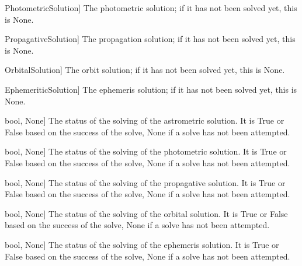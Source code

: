 \documentclass[letterpaper,11pt,english]{sphinxmanual}
\begin{document}
\begin{savenotes}
\begin{fulllineitems}
\begin{description}
\sphinxlineitem{photometrics}{[}PhotometricSolution{]}
\sphinxAtStartPar
The photometric solution; if it has not been solved yet, this is None.

\sphinxlineitem{propagatives}{[}PropagativeSolution{]}
\sphinxAtStartPar
The propagation solution; if it has not been solved yet, this is None.

\sphinxlineitem{orbitals}{[}OrbitalSolution{]}
\sphinxAtStartPar
The orbit solution; if it has not been solved yet, this is None.

\sphinxlineitem{ephemeritics}{[}EphemeriticSolution{]}
\sphinxAtStartPar
The ephemeris solution; if it has not been solved yet, this is None.

\sphinxlineitem{astrometrics\_status}{[}bool, None{]}
\sphinxAtStartPar
The status of the solving of the astrometric solution. It is True or
False based on the success of the solve, None if a solve has not
been attempted.

\sphinxlineitem{photometrics\_status}{[}bool, None{]}
\sphinxAtStartPar
The status of the solving of the photometric solution. It is True or
False based on the success of the solve, None if a solve has not
been attempted.

\sphinxlineitem{propagatives\_status}{[}bool, None{]}
\sphinxAtStartPar
The status of the solving of the propagative solution. It is True or
False based on the success of the solve, None if a solve has not
been attempted.

\sphinxlineitem{orbitals\_status}{[}bool, None{]}
\sphinxAtStartPar
The status of the solving of the orbital solution. It is True or
False based on the success of the solve, None if a solve has not
been attempted.

\sphinxlineitem{ephemeritics\_status}{[}bool, None{]}
\sphinxAtStartPar
The status of the solving of the ephemeris solution. It is True or
False based on the success of the solve, None if a solve has not
been attempted.

\end{description}


\end{fulllineitems}
\end{savenotes}
\end{document}
